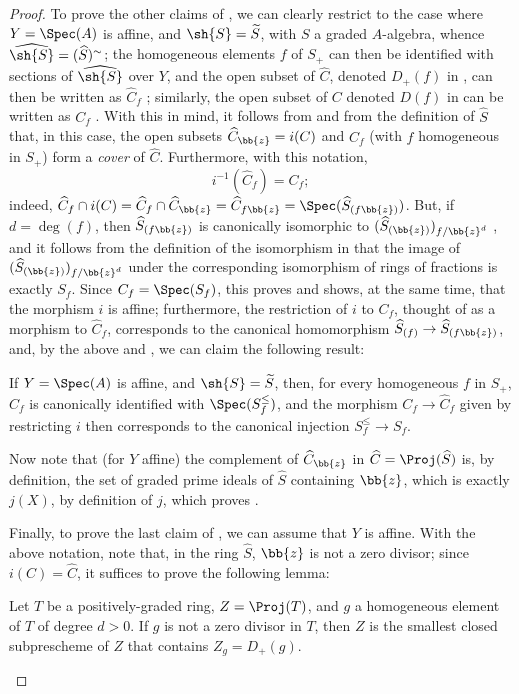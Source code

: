 \begin{proof}
To prove the other claims of , we can clearly restrict to the case where $Y=\Spec(A)$ is affine, and $\sh{S}=\widetilde{S}$, with $S$ a graded $A$-algebra, whence $\widehat{\sh{S}}=(\widehat{S})^\sim$;
the homogeneous elements $f$ of $S_+$ can then be identified with sections of $\widehat{\sh{S}}$ over $Y$, and the open subset of $\widehat{C}$, denoted $D_+(f)$ in , can then be written as $\widehat{C}_f$ ;
similarly, the open subset of $C$ denoted $D(f)$ in  can be written as $C_f$ .
With this in mind, it follows from  and from the definition of $\widehat{S}$ that, in this case, the open subsets $\widehat{C}_{\bb{z}}=i(C)$ and $\widehat{C}_f$ (with $f$ homogeneous in $S_+$) form a \emph{cover} of $\widehat{C}$.
Furthermore, with this notation,
\[
\label{II.8.3.2.5}
  i^{-1}(\widehat{C}_f) = C_f;
\tag{8.3.2.5}
\]
indeed, $\widehat{C}_f\cap i(C) = \widehat{C}_f\cap\widehat{C}_{\bb{z}} = \widehat{C}_{f\bb{z}} = \Spec(\widehat{S}_{(f\bb{z})})$.
But, if $d=\deg(f)$, then $\widehat{S}_{(f\bb{z})}$ is canonically isomorphic to $(\widehat{S}_{(\bb{z})})_{f/\bb{z}^d}$ , and it follows from the definition of the isomorphism in  that the image of $(\widehat{S}_{(\bb{z})})_{f/\bb{z}^d}$ under the corresponding isomorphism of rings of fractions is exactly $S_f$.
Since $C_f=\Spec(S_f)$, this proves  and shows, at the same time, that the morphism $i$ is affine;
furthermore, the restriction of $i$ to $C_f$, thought of as a morphism to $\widehat{C}_f$, corresponds  to the canonical homomorphism $\widehat{S}_{(f)}\to\widehat{S}_{(f\bb{z})}$, and, by the above and , we can claim the following result:
\begin{env}[8.3.2.6]
\label{II.8.3.2.6}
If $Y=\Spec(A)$ is affine, and $\sh{S}=\widetilde{S}$, then, for every homogeneous $f$ in $S_+$, $\widehat{C}_f$ is canonically identified with $\Spec(S_f^\leq)$, and the morphism $C_f\to\widehat{C}_f$ given by restricting $i$ then corresponds to the canonical injection $S_f^\leq\to S_f$.
\end{env}

Now note that (for $Y$ affine) the complement of $\widehat{C}_{\bb{z}}$ in $\widehat{C}=\Proj(\widehat{S})$
is, by definition, the set of graded prime ideals of $\widehat{S}$ containing $\bb{z}$, which is exactly $j(X)$, by definition of $j$, which proves .

Finally, to prove the last claim of , we can assume that $Y$ is affine.
With the above notation, note that, in the ring $\widehat{S}$, $\bb{z}$ is not a zero divisor;
since $i(C)=\widehat{C}$, it suffices to prove the following lemma:
\begin{lemma}[8.3.2.7]
\label{II.8.3.2.7}
Let $T$ be a positively-graded ring, $Z=\Proj(T)$, and $g$ a homogeneous element of $T$ of degree $d>0$.
If $g$ is not a zero divisor in $T$, then $Z$ is the smallest closed subprescheme of $Z$ that contains $Z_g=D_+(g)$.
\end{lemma}


\end{proof}
